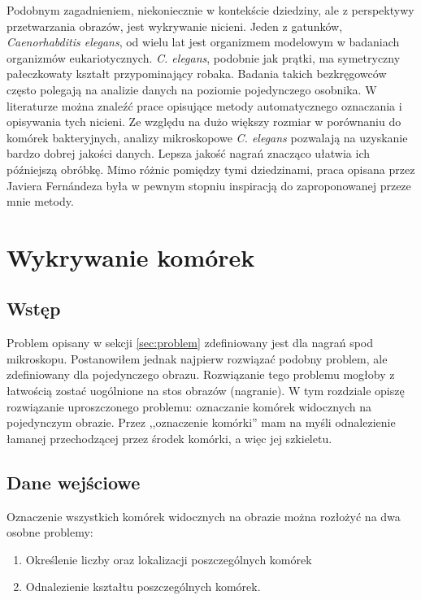 \documentclass[declaration,shortabstract,mgr]{iithesis}
\begin{document}

Podobnym zagadnieniem, niekoniecznie w kontekście dziedziny, ale z perspektywy przetwarzania obrazów, jest wykrywanie nicieni.
Jeden z gatunków, \emph{Caenorhabditis elegans}, od wielu lat jest organizmem modelowym w badaniach organizmów eukariotycznych\cite{wiki:c-elegans}.
\emph{C. elegans}, podobnie jak prątki, ma symetryczny pałeczkowaty kształt przypominający robaka.
Badania takich bezkręgowców często polegają na analizie danych na poziomie pojedynczego osobnika.
W literaturze można znaleźć prace opisujące metody automatycznego oznaczania i opisywania tych nicieni.
Ze względu na dużo większy rozmiar w porównaniu do komórek bakteryjnych, analizy mikroskopowe \emph{C. elegans} pozwalają na uzyskanie bardzo dobrej jakości danych.
Lepsza jakość nagrań znacząco ułatwia ich późniejszą obróbkę.
Mimo różnic pomiędzy tymi dziedzinami, praca opisana przez Javiera Fernándeza\cite{paper:worm-detection} była w pewnym stopniu inspiracją do zaproponowanej przeze mnie metody.


\section{Wykrywanie komórek}
\label{sec:cell-detection}

\subsection{Wstęp}

Problem opisany w sekcji \ref{sec:problem} zdefiniowany jest dla nagrań spod mikroskopu. Postanowiłem jednak najpierw rozwiązać podobny problem, ale zdefiniowany dla pojedynczego obrazu. Rozwiązanie tego problemu mogłoby z łatwością zostać uogólnione na stos obrazów (nagranie). W tym rozdziale opiszę rozwiązanie uproszczonego problemu: oznaczanie komórek widocznych na pojedynczym obrazie. Przez ,,oznaczenie komórki'' mam na myśli odnalezienie łamanej przechodzącej przez środek komórki, a więc jej szkieletu.

\subsection{Dane wejściowe}
\label{sec:detection-input}

Oznaczenie wszystkich komórek widocznych na obrazie można rozłożyć na dwa osobne problemy:
\begin{enumerate}
  \item Określenie liczby oraz lokalizacji poszczególnych komórek
  \item Odnalezienie kształtu poszczególnych komórek.
\end{enumerate}
\end{document}
